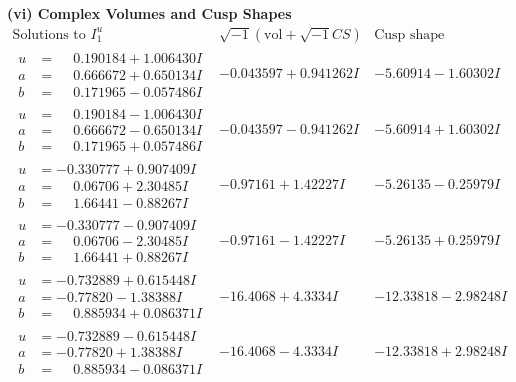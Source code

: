 \documentclass[1p]{elsarticle_modified}
\theoremstyle{definition}
\newcommand{\I}{\sqrt{-1}}
\begin{document}
\newpage\flushleft \textbf{(vi) Complex Volumes and Cusp Shapes}
$$\begin{array}{c|c|c}  
\text{Solutions to }I^u_{1}& \I (\text{vol} + \sqrt{-1}CS) & \text{Cusp shape}\\
 \hline 
\begin{aligned}
u &= \phantom{-}0.190184 + 1.006430 I \\
a &= \phantom{-}0.666672 + 0.650134 I \\
b &= \phantom{-}0.171965 - 0.057486 I\end{aligned}
 & -0.043597 + 0.941262 I & -5.60914 - 1.60302 I \\ \hline\begin{aligned}
u &= \phantom{-}0.190184 - 1.006430 I \\
a &= \phantom{-}0.666672 - 0.650134 I \\
b &= \phantom{-}0.171965 + 0.057486 I\end{aligned}
 & -0.043597 - 0.941262 I & -5.60914 + 1.60302 I \\ \hline\begin{aligned}
u &= -0.330777 + 0.907409 I \\
a &= \phantom{-}0.06706 + 2.30485 I \\
b &= \phantom{-}1.66441 - 0.88267 I\end{aligned}
 & -0.97161 + 1.42227 I & -5.26135 - 0.25979 I \\ \hline\begin{aligned}
u &= -0.330777 - 0.907409 I \\
a &= \phantom{-}0.06706 - 2.30485 I \\
b &= \phantom{-}1.66441 + 0.88267 I\end{aligned}
 & -0.97161 - 1.42227 I & -5.26135 + 0.25979 I \\ \hline\begin{aligned}
u &= -0.732889 + 0.615448 I \\
a &= -0.77820 - 1.38388 I \\
b &= \phantom{-}0.885934 + 0.086371 I\end{aligned}
 & -16.4068 + 4.3334 I & -12.33818 - 2.98248 I \\ \hline\begin{aligned}
u &= -0.732889 - 0.615448 I \\
a &= -0.77820 + 1.38388 I \\
b &= \phantom{-}0.885934 - 0.086371 I\end{aligned}
 & -16.4068 - 4.3334 I & -12.33818 + 2.98248 I \\ \hline\begin{aligned}

\end{aligned}
\end{array}$$
\end{document}
